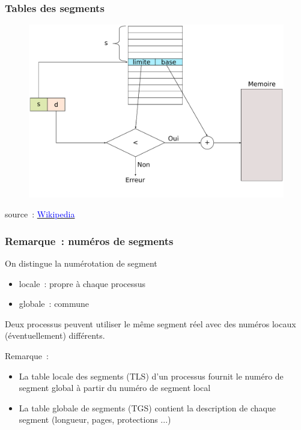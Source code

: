 \begin{frame}
  \frametitle{Tables des segments}
\begin{figure}[h]
  \includegraphics[width=\textwidth]{fig2/segmentation}
\end{figure}
\vspace{-0.5cm}
\small{source~: \href{http://fr.wikipedia.org/wiki/Fichier:Vm7.svg}{\textcolor{blue}{Wikipedia}}}
\end{frame}



\begin{frame}
\frametitle{Remarque~: numéros de segments}

On distingue la numérotation de segment
\begin{itemize} 
\item locale~: propre à chaque processus
\item globale~: commune
\end{itemize}

Deux processus peuvent utiliser le même segment réel 
avec des numéros locaux (éventuellement) différents.

Remarque~:\\
\begin{itemize}
\item La \alert{table locale des segments} (TLS) d'un processus
fournit le \alert{numéro de segment global} à partir du
\alert{numéro de segment local}
\item La \alert{table globale de segments} (TGS) contient la description de
chaque segment (longueur, pages, protections ...)
\end{itemize}
\end{frame}

